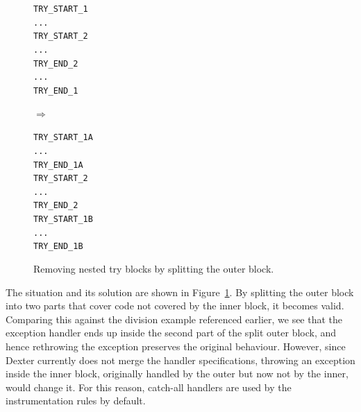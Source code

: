\documentclass[12pt,twoside,notitlepage]{report}
\newcommand{\asm}[1] {\texttt{#1}}
\begin{document}
\begin{figure}[h]
	\centering
	\begin{minipage}{0.140\textwidth}
	\begin{footnotesize}
		\asm{TRY\_START\_1} \\
		\asm{...} \\
		\asm{TRY\_START\_2} \\
		\asm{...} \\
		\asm{TRY\_END\_2} \\
		\asm{...} \\
		\asm{TRY\_END\_1}
	\end{footnotesize}
	\end{minipage}
	\begin{minipage}{0.09\textwidth}
	\centering
	$\Rightarrow$
	\end{minipage}
	\begin{minipage}{0.150\textwidth}
	\begin{footnotesize}
		\asm{TRY\_START\_1A} \\
		\asm{...} \\
		\asm{TRY\_END\_1A} \\
		\asm{TRY\_START\_2} \\
		\asm{...} \\
		\asm{TRY\_END\_2} \\
		\asm{TRY\_START\_1B} \\
		\asm{...} \\
		\asm{TRY\_END\_1B}
	\end{footnotesize}
	\end{minipage}
	\caption{Removing nested try blocks by splitting the outer block.}
	\label{figure:Instrumentation_TryBlockSplitting}
\end{figure}

The situation and its solution are shown in Figure~\ref{figure:Instrumentation_TryBlockSplitting}. By splitting the outer block into two parts that cover code not covered by the inner block, it becomes valid. Comparing this against the division example referenced earlier, we see that the exception handler ends up inside the second part of the split outer block, and hence rethrowing the exception preserves the original behaviour. However, since Dexter currently does not merge the handler specifications, throwing an exception inside the inner block, originally handled by the outer but now not by the inner, would change it. For this reason, catch-all handlers are used by the instrumentation rules by default. 

\label{section:Code_MethodEntering}
\end{document}
